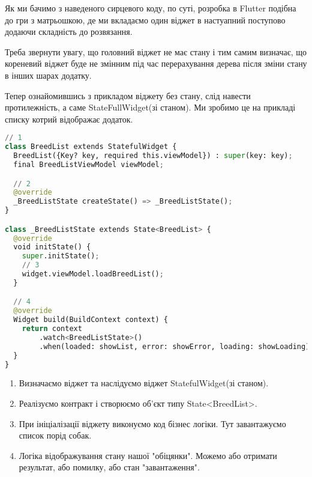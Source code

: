 Як ми бачимо з наведеного сирцевого коду, по суті, розробка в Flutter подібна до гри з матрьошкою,
де ми вкладаємо один віджет в настуапний поступово додаючи складність до розвязання.

Треба звернути увагу, що головний віджет не має стану і тим самим визначає, що кореневий віджет буде не змінним
під час перерахування дерева після зміни стану в інших шарах додатку.

Тепер ознайомившись з прикладом віджету без стану, слід навести протилежність, а саме StateFullWidget(зі станом).
Ми зробимо це на прикладі списку котрий відображає додаток.

\begin{lstlisting}[style=light, language=Python,label={lst:flutter_app_widget},caption=Flutter StatefulWidget]
// 1
class BreedList extends StatefulWidget {
  BreedList({Key? key, required this.viewModel}) : super(key: key);
  final BreedListViewModel viewModel;

  // 2
  @override
  _BreedListState createState() => _BreedListState();
}

class _BreedListState extends State<BreedList> {
  @override
  void initState() {
    super.initState();
    // 3
    widget.viewModel.loadBreedList();
  }

  // 4
  @override
  Widget build(BuildContext context) {
    return context
        .watch<BreedListState>()
        .when(loaded: showList, error: showError, loading: showLoading);
  }
}
\end{lstlisting}

\begin{enumerate}
    \item Визначаємо віджет та наслідуємо віджет StatefulWidget(зі станом).
    \item Реалізуємо контракт і створюємо об'єкт типу State<BreedList>.
    \item При ініціалізації віджету виконуємо код бізнес логіки. Тут завантажуємо список порід собак.
    \item Логіка відображування стану нашої "обіцянки". Можемо або отримати результат, або помилку, або стан "завантаження".
\end{enumerate}
